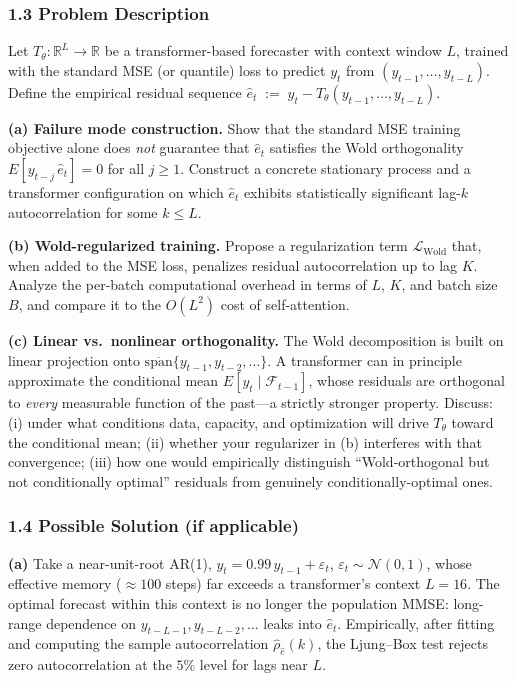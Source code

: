 \documentclass[11pt]{article}
\begin{document}
\subsubsection*{1.3 Problem Description}
Let $T_\theta : \mathbb{R}^L \to \mathbb{R}$ be a transformer-based forecaster with context window $L$, trained with the standard MSE (or quantile) loss to predict $y_t$ from $(y_{t-1}, \ldots, y_{t-L})$. Define the empirical residual sequence $\hat e_t \;:=\; y_t - T_\theta(y_{t-1}, \ldots, y_{t-L})$.

\textbf{(a) Failure mode construction.} Show that the standard MSE training objective alone does \emph{not} guarantee that $\hat e_t$ satisfies the Wold orthogonality $E[y_{t-j}\, \hat e_t] = 0$ for all $j \geq 1$. Construct a concrete stationary process and a transformer configuration on which $\hat e_t$ exhibits statistically significant lag-$k$ autocorrelation for some $k \leq L$.

\textbf{(b) Wold-regularized training.} Propose a regularization term $\mathcal{L}_{\text{Wold}}$ that, when added to the MSE loss, penalizes residual autocorrelation up to lag $K$. Analyze the per-batch computational overhead in terms of $L$, $K$, and batch size $B$, and compare it to the $O(L^2)$ cost of self-attention.

\textbf{(c) Linear vs.\ nonlinear orthogonality.} The Wold decomposition is built on linear projection onto $\overline{\mathrm{span}}\{y_{t-1}, y_{t-2}, \ldots\}$. A transformer can in principle approximate the conditional mean $E[y_t \mid \mathcal{F}_{t-1}]$, whose residuals are orthogonal to \emph{every} measurable function of the past---a strictly stronger property. Discuss: (i) under what conditions data, capacity, and optimization will drive $T_\theta$ toward the conditional mean; (ii) whether your regularizer in (b) interferes with that convergence; (iii) how one would empirically distinguish ``Wold-orthogonal but not conditionally optimal'' residuals from genuinely conditionally-optimal ones.

\subsubsection*{1.4 Possible Solution (if applicable)}
\textbf{(a)} Take a near-unit-root AR(1), $y_t = 0.99\, y_{t-1} + \varepsilon_t$, $\varepsilon_t \sim \mathcal{N}(0,1)$, whose effective memory ($\approx 100$ steps) far exceeds a transformer's context $L = 16$. The optimal forecast within this context is no longer the population MMSE: long-range dependence on $y_{t-L-1}, y_{t-L-2}, \ldots$ leaks into $\hat e_t$. Empirically, after fitting and computing the sample autocorrelation $\hat\rho_{\hat e}(k)$, the Ljung--Box test rejects zero autocorrelation at the $5\%$ level for lags near $L$.
\end{document}
